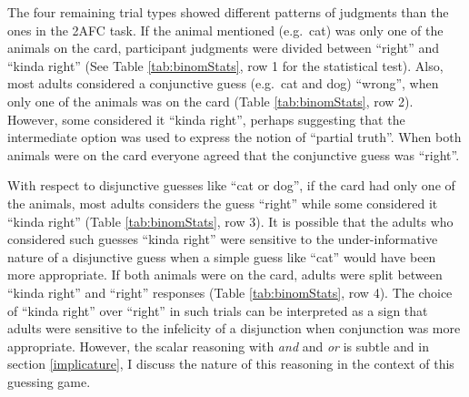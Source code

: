 \documentclass[man]{apa6}
\theoremstyle{definition}
\theoremstyle{definition}
\theoremstyle{definition}
\theoremstyle{remark}
\begin{document}
The four remaining trial types showed different patterns of judgments
than the ones in the 2AFC task. If the animal mentioned (e.g.~cat) was
only one of the animals on the card, participant judgments were divided
between \enquote{right} and \enquote{kinda right} (See Table
\ref{tab:binomStats}, row 1 for the statistical test). Also, most adults
considered a conjunctive guess (e.g.~cat and dog) \enquote{wrong}, when
only one of the animals was on the card (Table \ref{tab:binomStats}, row
2). However, some considered it \enquote{kinda right}, perhaps
suggesting that the intermediate option was used to express the notion
of \enquote{partial truth}. When both animals were on the card everyone
agreed that the conjunctive guess was \enquote{right}.

With respect to disjunctive guesses like \enquote{cat or dog}, if the
card had only one of the animals, most adults considers the guess
\enquote{right} while some considered it \enquote{kinda right} (Table
\ref{tab:binomStats}, row 3). It is possible that the adults who
considered such guesses \enquote{kinda right} were sensitive to the
under-informative nature of a disjunctive guess when a simple guess like
\enquote{cat} would have been more appropriate. If both animals were on
the card, adults were split between \enquote{kinda right} and
\enquote{right} responses (Table \ref{tab:binomStats}, row 4). The
choice of \enquote{kinda right} over \enquote{right} in such trials can
be interpreted as a sign that adults were sensitive to the infelicity of
a disjunction when conjunction was more appropriate. However, the scalar
reasoning with \emph{and} and \emph{or} is subtle and in section
\ref{implicature}, I discuss the nature of this reasoning in the context
of this guessing game.
\end{document}
